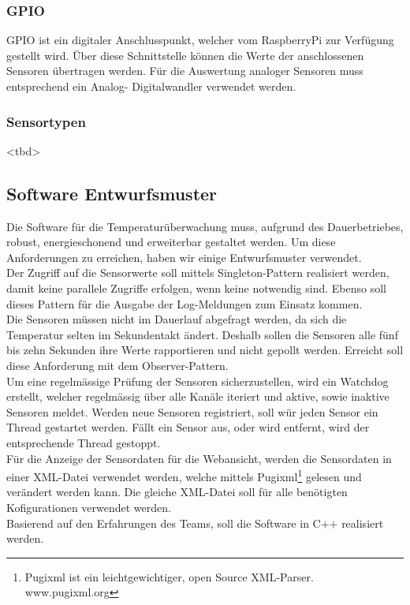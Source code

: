 \subsubsection{GPIO}
GPIO ist ein digitaler Anschlusspunkt, welcher vom RaspberryPi zur Verfügung gestellt wird. Über diese Schnittstelle können die Werte der anschlossenen Sensoren übertragen werden. Für die Auswertung analoger Sensoren muss entsprechend ein Analog- Digitalwandler verwendet werden.

\subsubsection{Sensortypen}
<tbd>

\subsection{Software Entwurfsmuster}
Die Software für die Temperaturüberwachung muss, aufgrund des Dauerbetriebes, robust, energieschonend und erweiterbar gestaltet werden. Um diese Anforderungen zu erreichen, haben wir einige Entwurfsmuster verwendet.\\
Der Zugriff auf die Sensorwerte soll mittels Singleton-Pattern realisiert werden, damit keine parallele Zugriffe erfolgen, wenn keine notwendig sind. Ebenso soll dieses Pattern für die Ausgabe der Log-Meldungen zum Einsatz kommen.\\
Die Sensoren müssen nicht im Dauerlauf abgefragt werden, da sich die Temperatur selten im Sekundentakt ändert. Deshalb sollen die Sensoren alle fünf bis zehn Sekunden ihre Werte rapportieren und nicht gepollt werden. Erreicht soll diese Anforderung mit dem Observer-Pattern.\\
Um eine regelmässige Prüfung der Sensoren sicherzustellen, wird ein Watchdog erstellt, welcher regelmässig über alle Kanäle iteriert und aktive, sowie inaktive Sensoren meldet. Werden neue Sensoren registriert, soll wür jeden Sensor ein Thread gestartet werden. Fällt ein Sensor aus, oder wird entfernt, wird der entsprechende Thread gestoppt.\\
Für die Anzeige der Sensordaten für die Webansicht, werden die Sensordaten in einer XML-Datei verwendet werden, welche mittels Pugixml\footnote{Pugixml ist ein leichtgewichtiger, open Source XML-Parser. www.pugixml.org} gelesen und verändert werden kann. Die gleiche XML-Datei soll für alle benötigten Kofigurationen verwendet werden.\\
Basierend auf den Erfahrungen des Teams, soll die Software in C++ realisiert werden.

